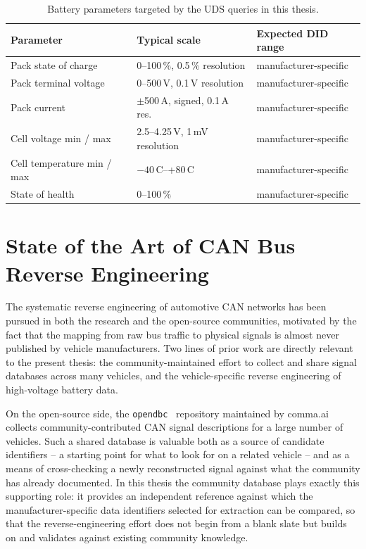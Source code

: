 \documentclass[11pt,a4paper,oneside,parskip=half]{scrreprt}
\begin{document}
\begin{table}[H]
\caption{Battery parameters targeted by the UDS queries in this thesis.}
\label{tab:battery_signals}
\centering
\begin{tabular}{lp{4cm}l}
\toprule
\textbf{Parameter}           & \textbf{Typical scale}             & \textbf{Expected DID range} \\
\midrule
Pack state of charge         & 0--100\,\%, 0.5\,\% resolution     & manufacturer-specific \\
Pack terminal voltage        & 0--500\,V, 0.1\,V resolution       & manufacturer-specific \\
Pack current                 & $\pm$500\,A, signed, 0.1\,A res.   & manufacturer-specific \\
Cell voltage min / max       & 2.5--4.25\,V, 1\,mV resolution     & manufacturer-specific \\
Cell temperature min / max   & $-40$\,\textdegree{}C--+80\,\textdegree{}C & manufacturer-specific \\
State of health              & 0--100\,\%                         & manufacturer-specific \\
\bottomrule
\end{tabular}
\end{table}

\section{State of the Art of CAN Bus Reverse Engineering}
The systematic reverse engineering of automotive CAN networks has been pursued in both the research and the open-source communities, motivated by the fact that the mapping from raw bus traffic to physical signals is almost never published by vehicle manufacturers. Two lines of prior work are directly relevant to the present thesis: the community-maintained effort to collect and share signal databases across many vehicles, and the vehicle-specific reverse engineering of high-voltage battery data.

On the open-source side, the \texttt{opendbc}~\cite{opendbc} repository maintained by comma.ai collects community-contributed CAN signal descriptions for a large number of vehicles. Such a shared database is valuable both as a source of candidate identifiers -- a starting point for what to look for on a related vehicle -- and as a means of cross-checking a newly reconstructed signal against what the community has already documented. In this thesis the community database plays exactly this supporting role: it provides an independent reference against which the manufacturer-specific data identifiers selected for extraction can be compared, so that the reverse-engineering effort does not begin from a blank slate but builds on and validates against existing community knowledge.
\end{document}
